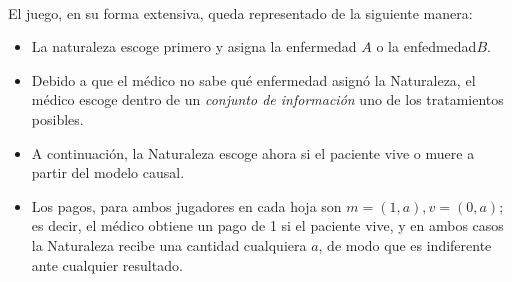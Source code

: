 \documentclass[11pt]{article}
\theoremstyle{plain}
\begin{document}
\\
El juego, en su forma extensiva, queda representado de la siguiente manera:\\
\begin{itemize}
\item La naturaleza escoge primero y asigna la enfermedad $A$ o la enfedmedad$B$.
\item Debido a que el médico no sabe qué enfermedad asignó la Naturaleza, el médico escoge dentro de un \textit{conjunto de información} uno de los tratamientos posibles.
\item A continuación, la Naturaleza escoge ahora si el paciente vive o muere a partir del modelo causal.
\item Los pagos, para ambos jugadores en cada hoja son $m=(1,a), v=(0,a)$; es decir, el médico obtiene un pago de 1 si el paciente vive, y en ambos casos la Naturaleza recibe una cantidad cualquiera $a$, de modo que es indiferente ante cualquier resultado. 
\end{itemize}
\end{document}
